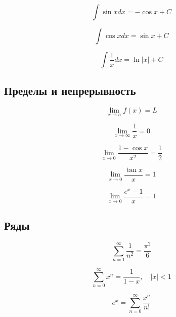 \documentclass[a4paper,12pt]{article}
\begin{document}
\begin{equation}
\int \sin x dx = -\cos x + C
\end{equation}

\begin{equation}
\int \cos x dx = \sin x + C
\end{equation}

\begin{equation}
\int \frac{1}{x} dx = \ln|x| + C
\end{equation}

\subsection{Пределы и непрерывность}
\setcounter{equation}{0}

\begin{equation}
\lim_{x \to a} f(x) = L
\end{equation}

\begin{equation}
\lim_{x \to \infty} \frac{1}{x} = 0
\end{equation}

\begin{equation}
\lim_{x \to 0} \frac{1 - \cos x}{x^2} = \frac{1}{2}
\end{equation}

\begin{equation}
\lim_{x \to 0} \frac{\tan x}{x} = 1
\end{equation}

\begin{equation}
\lim_{x \to 0} \frac{e^x - 1}{x} = 1
\end{equation}

\subsection{Ряды}
\setcounter{equation}{0}

\begin{equation}
\sum_{n=1}^{\infty} \frac{1}{n^2} = \frac{\pi^2}{6}
\end{equation}

\begin{equation}
\sum_{n=0}^{\infty} x^n = \frac{1}{1-x}, \quad |x|<1
\end{equation}

\begin{equation}
e^x = \sum_{n=0}^{\infty} \frac{x^n}{n!}
\end{equation}
\end{document}
